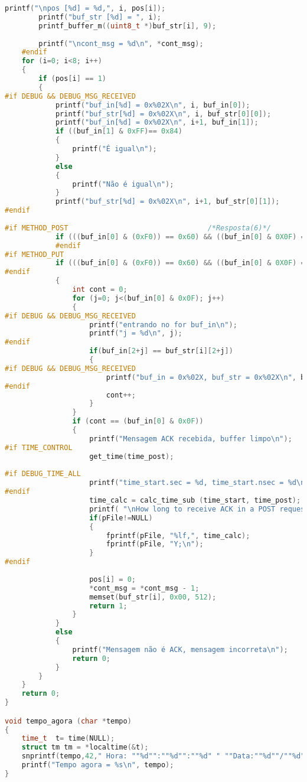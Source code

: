 \begin{lstlisting}[language=C++]
		printf("\npos [%d] = %d,", i, pos[i]);
		printf("buf_str [%d] = ", i);
		printf_buffer_m((uint8_t *)buf_str[i], 9);
		
		printf("\ncont_msg = %d\n", *cont_msg);
	#endif
	for (i=0; i<8; i++)
	{
		if (pos[i] == 1)
		{
#if DEBUG && DEBUG_MSG_RECEIVED
			printf("buf_in[%d] = 0x%02X\n", i, buf_in[0]);
			printf("buf_str[%d] = 0x%02X\n", i, buf_str[0][0]);
			printf("buf_in[%d] = 0x%02X\n", i+1, buf_in[1]);
			if ((buf_in[1] & 0xFF)== 0x84)
			{
				printf("É igual\n");
			}
			else
			{
				printf("Não é igual\n");
			}
			printf("buf_str[%d] = 0x%02X\n", i+1, buf_str[0][1]);
#endif
			
#if METHOD_POST									/*Resposta(6)*/			
			if (((buf_in[0] & (0xF0)) == 0x60) && ((buf_in[0] & 0X0F) == (buf_str[i][0] & 0x0F)) && ((buf_in[1] & 0xFF )== 0x44))
			#endif
#if METHOD_PUT
			if (((buf_in[0] & (0xF0)) == 0x60) && ((buf_in[0] & 0X0F) == (buf_str[i][0] & 0x0F)) && ((buf_in[1] & 0xFF )== 0x44))
#endif
			{
				int cont = 0;
				for (j=0; j<(buf_in[0] & 0x0F); j++)
				{
#if DEBUG && DEBUG_MSG_RECEIVED
					printf("entrando no for buf_in\n");
					printf("j = %d\n", j);
#endif
					if(buf_in[2+j] == buf_str[i][2+j])
					{
#if DEBUG && DEBUG_MSG_RECEIVED
						printf("buf_in = 0x%02X, buf_str = 0x%02X\n", buf_in[2+j], buf_str[i][2+j]);
#endif
						cont++;
					}
				}
				if (cont == (buf_in[0] & 0x0F))
				{
					printf("Mensagem ACK recebida, buffer limpo\n");
#if TIME_CONTROL
					get_time(time_post);
					
#if DEBUG_TIME_ALL
					printf("time_start.sec = %d, time_start.nsec = %d\ntime_post_ACK.sec = %d, time_post_ACK.nsec = %d", (int)time_start->tv_sec, (int)time_start->tv_nsec, (int)time_post->tv_sec, (int)time_post->tv_nsec);
#endif
					time_calc = calc_time_sub (time_start, time_post);	    		
					printf( "\nHow long to receive ACK in a POST request = %lf\n", time_calc);
					if(pFile!=NULL)
					{
						fprintf(pFile, "%lf,", time_calc);
						fprintf(pFile, "Y;\n");
					}
#endif
					
					pos[i] = 0;
					*cont_msg = *cont_msg - 1;
					memset(buf_str[i], 0x00, 512);
					return 1;
				}
			}
			else
			{
				printf("Mensagem não é ACK, mensagem incorreta\n");
				return 0;
			}
		}
	}
	return 0;
}

void tempo_agora (char *tempo)
{
	time_t  t= time(NULL);
	struct tm tm = *localtime(&t);
	snprintf(tempo,42," Hora: ""%d"":""%d"":""%d" " ""Data:""%d""/""%d", tm.tm_hour, tm.tm_min, tm.tm_sec, tm.tm_mday, tm.tm_mon);
	printf("Tempo agora = %s\n", tempo);
}


\end{lstlisting}
